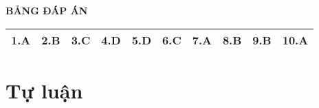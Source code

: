 \whiteBGstarEnd

\loigiai
{
	\begin{center}
		\textbf{BẢNG ĐÁP ÁN}
	\end{center}
	\begin{center}
		\begin{tabular}{|m{2.8em}|m{2.8em}|m{2.8em}|m{2.8em}|m{2.8em}|m{2.8em}|m{2.8em}|m{2.8em}|m{2.8em}|m{2.8em}|}
			\hline
			1.A  & 2.B  & 3.C  & 4.D  & 5.D  & 6.C  & 7.A  & 8.B  & 9.B  & 10.A  \\
			\hline
			
		\end{tabular}
	\end{center}
}
\section{Tự luận}
